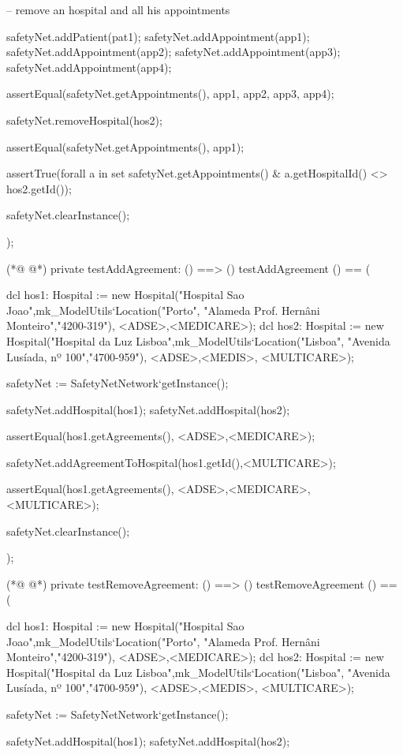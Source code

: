 \begin{vdmpp}[breaklines=true]
  -- remove an hospital and all his appointments
  
  safetyNet.addPatient(pat1);
  safetyNet.addAppointment(app1);
  safetyNet.addAppointment(app2);
  safetyNet.addAppointment(app3);
  safetyNet.addAppointment(app4);
  
  assertEqual(safetyNet.getAppointments(), {app1, app2, app3, app4}); 
  
  safetyNet.removeHospital(hos2);
  
  assertEqual(safetyNet.getAppointments(), {app1});
  
  assertTrue(forall a in set safetyNet.getAppointments() & a.getHospitalId() <> hos2.getId()); 
  
  safetyNet.clearInstance();
    
);

(*@
\label{testAddAgreement:784}
@*)
private testAddAgreement: () ==> ()
 testAddAgreement () == (
  
  dcl hos1: Hospital := new Hospital("Hospital Sao Joao",mk_ModelUtils`Location("Porto", "Alameda Prof. Hernâni Monteiro","4200-319"), {<ADSE>,<MEDICARE>});
  dcl hos2: Hospital := new Hospital("Hospital da Luz Lisboa",mk_ModelUtils`Location("Lisboa", "Avenida Lusíada, nº 100","4700-959"), {<ADSE>,<MEDIS>, <MULTICARE>});
  
  safetyNet := SafetyNetNetwork`getInstance();
   
  safetyNet.addHospital(hos1);
  safetyNet.addHospital(hos2);
  
  assertEqual(hos1.getAgreements(), {<ADSE>,<MEDICARE>});
  
  safetyNet.addAgreementToHospital(hos1.getId(),<MULTICARE>);
  
  assertEqual(hos1.getAgreements(), {<ADSE>,<MEDICARE>, <MULTICARE>});
  
  safetyNet.clearInstance();
    
);

(*@
\label{testRemoveAgreement:805}
@*)
private testRemoveAgreement: () ==> ()
 testRemoveAgreement () == (
  
  dcl hos1: Hospital := new Hospital("Hospital Sao Joao",mk_ModelUtils`Location("Porto", "Alameda Prof. Hernâni Monteiro","4200-319"), {<ADSE>,<MEDICARE>});
  dcl hos2: Hospital := new Hospital("Hospital da Luz Lisboa",mk_ModelUtils`Location("Lisboa", "Avenida Lusíada, nº 100","4700-959"), {<ADSE>,<MEDIS>, <MULTICARE>});
  
  safetyNet := SafetyNetNetwork`getInstance();
   
  safetyNet.addHospital(hos1);
  safetyNet.addHospital(hos2);
  

\end{vdmpp}
